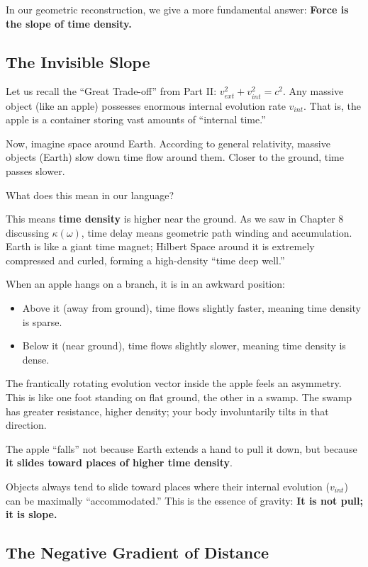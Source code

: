 \documentclass[11pt,a4paper,twoside]{book}
\begin{document}
In our geometric reconstruction, we give a more fundamental answer: \textbf{Force is the slope of time density.}

\subsection{The Invisible Slope}

Let us recall the ``Great Trade-off'' from Part II: $v_{ext}^2 + v_{int}^2 = c^2$. Any massive object (like an apple) possesses enormous internal evolution rate $v_{int}$. That is, the apple is a container storing vast amounts of ``internal time.''

Now, imagine space around Earth. According to general relativity, massive objects (Earth) slow down time flow around them. Closer to the ground, time passes slower.

What does this mean in our language?

This means \textbf{time density} is higher near the ground. As we saw in Chapter 8 discussing $\kappa(\omega)$, time delay means geometric path winding and accumulation. Earth is like a giant time magnet; Hilbert Space around it is extremely compressed and curled, forming a high-density ``time deep well.''

When an apple hangs on a branch, it is in an awkward position:

\begin{itemize}
\item Above it (away from ground), time flows slightly faster, meaning time density is sparse.

\item Below it (near ground), time flows slightly slower, meaning time density is dense.
\end{itemize}

The frantically rotating evolution vector inside the apple feels an asymmetry. This is like one foot standing on flat ground, the other in a swamp. The swamp has greater resistance, higher density; your body involuntarily tilts in that direction.

The apple ``falls'' not because Earth extends a hand to pull it down, but because \textbf{it slides toward places of higher time density}.

Objects always tend to slide toward places where their internal evolution ($v_{int}$) can be maximally ``accommodated.'' This is the essence of gravity: \textbf{It is not pull; it is slope.}

\subsection{The Negative Gradient of Distance}
\end{document}
